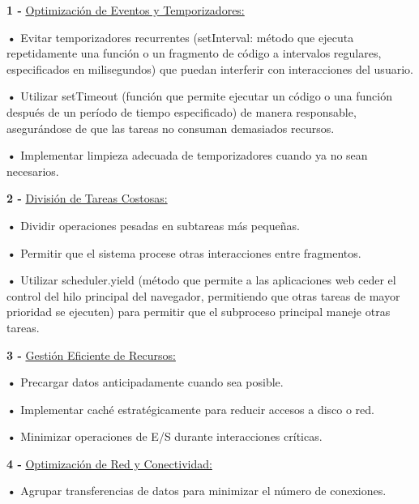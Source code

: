 \documentclass{article}
\begin{document}
\quad

\textbf{1 -  } {\underline{Optimización de Eventos y Temporizadores: }}

\quad

\textbf{    •} { Evitar temporizadores recurrentes (setInterval: método que ejecuta repetidamente una función o un fragmento de código a intervalos regulares, especificados en milisegundos) que puedan interferir con interacciones del usuario.}

\textbf{    •} { Utilizar setTimeout (función que permite ejecutar un código o una función después de un período de tiempo especificado) de manera responsable, asegurándose de que las tareas no consuman demasiados recursos.}

\textbf{    •} { Implementar limpieza adecuada de temporizadores cuando ya no sean necesarios.}






\quad

\textbf{2 -  } {\underline{División de Tareas Costosas: }}

\quad

\textbf{    •} { Dividir operaciones pesadas en subtareas más pequeñas.}

\textbf{    •} { Permitir que el sistema procese otras interacciones entre fragmentos.}

\textbf{    •} { Utilizar scheduler.yield (método que permite a las aplicaciones web ceder el control del hilo principal del navegador, permitiendo que otras tareas de mayor prioridad se ejecuten) para permitir que el subproceso principal maneje otras tareas.}




\quad

\textbf{3 -  } {\underline{Gestión Eficiente de Recursos: }}

\quad

\textbf{    •} { Precargar datos anticipadamente cuando sea posible.}

\textbf{    •} { Implementar caché estratégicamente para reducir accesos a disco o red.}

\textbf{    •} { Minimizar operaciones de E/S durante interacciones críticas.}




\quad

\textbf{4 -  } {\underline{Optimización de Red y Conectividad: }}

\quad

\textbf{    •} { Agrupar transferencias de datos para minimizar el número de conexiones.}
\end{document}
